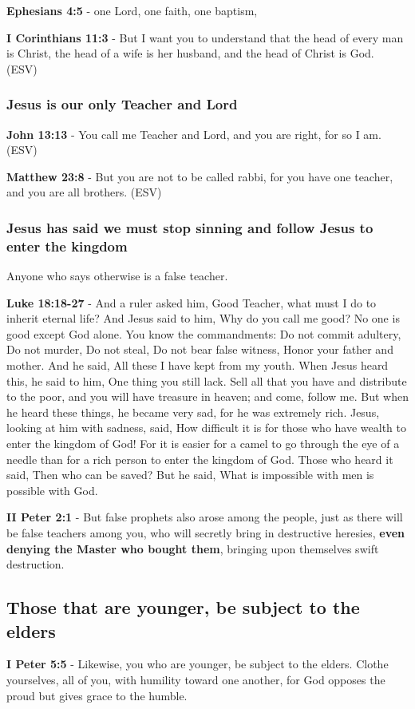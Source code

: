 \documentclass[11pt]{article}
\begin{document}
\textbf{Ephesians 4:5} - one Lord, one faith, one baptism,

\textbf{I Corinthians 11:3} - But I want you to understand that the head of every man is Christ, the head of a wife is her husband, and the head of Christ is God. (ESV)

\subsubsection{Jesus is our only Teacher and Lord}
\label{sec:orgf4ebd8e}
\textbf{John 13:13} - You call me Teacher and Lord, and you are right, for so I am. (ESV)

\textbf{Matthew 23:8} - But you are not to be called rabbi, for you have one teacher, and you are all brothers. (ESV)

\subsubsection{Jesus has said we must stop sinning and follow Jesus to enter the kingdom}
\label{sec:org7cb1ef5}
Anyone who says otherwise is a false teacher.

\textbf{Luke 18:18-27} - And a ruler asked him, Good Teacher, what must I do to inherit eternal life? And Jesus said to him, Why do you call me good? No one is good except God alone. You know the commandments: Do not commit adultery, Do not murder, Do not steal, Do not bear false witness, Honor your father and mother. And he said, All these I have kept from my youth. When Jesus heard this, he said to him, One thing you still lack. Sell all that you have and distribute to the poor, and you will have treasure in heaven; and come, follow me. But when he heard these things, he became very sad, for he was extremely rich. Jesus, looking at him with sadness, said, How difficult it is for those who have wealth to enter the kingdom of God! For it is easier for a camel to go through the eye of a needle than for a rich person to enter the kingdom of God. Those who heard it said, Then who can be saved? But he said, What is impossible with men is possible with God.

\textbf{II Peter 2:1} - But false prophets also arose among the people, just as there will be false teachers among you, who will secretly bring in destructive heresies, \textbf{even denying the Master who bought them}, bringing upon themselves swift destruction.

\subsection{Those that are younger, be subject to the elders}
\label{sec:orgd1d6642}
\textbf{I Peter 5:5} - Likewise, you who are younger, be subject to the elders. Clothe yourselves, all of you, with humility toward one another, for God opposes the proud but gives grace to the humble.
\end{document}
